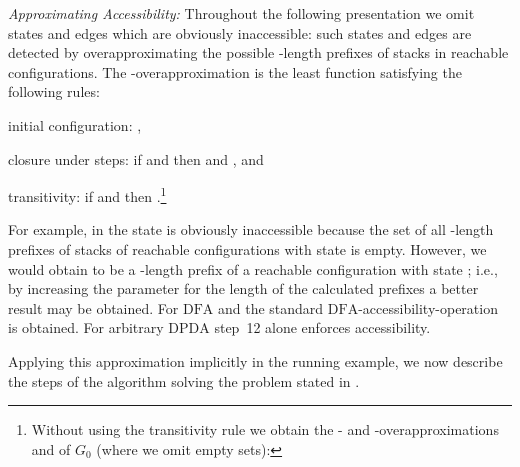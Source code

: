 \documentclass[draft]{ifacconf}
\newcommand{\STEP}[1]{\ensuremath{G_{#1}}\xspace}
\newcommand{\DFA}{\ensuremath{\mathrm{DFA}}\xspace}
\newcommand{\DPDA}{\ensuremath{\mathrm{DPDA}}\xspace}
\newcommand{\myparagraph}[1]{\par\emph{#1:}}
\begin{document}
\myparagraph{Approximating Accessibility}\label{mypar:ApproximatingAccessibility}
Throughout the following presentation we omit states and edges which are obviously inaccessible: such states and edges are detected by overapproximating the possible -length prefixes of stacks in reachable configurations.
The -overapproximation  is the least function satisfying the following rules:
\begin{inparaenum}[(i)]
\item initial configuration: ,
\item closure under steps: if  and  then  and , and
\item transitivity: if  and  then .\footnote{
Without using the transitivity rule we obtain the - and -overapproximations  and  of \STEP{0} (where we omit empty sets):




}
\end{inparaenum}


For example, in  the state  is obviously inaccessible because the set of all -length prefixes of stacks of reachable configurations with state  is empty. However, we would obtain  to be a -length prefix of a reachable configuration with state ; i.e., by increasing the parameter for the length of the calculated prefixes a better result may be obtained. For \DFA and  the standard \DFA-accessibility-operation is obtained.
For arbitrary \DPDA step~12 alone enforces accessibility.

\newcommand{\OPNAME}[1]{\ensuremath{f_{\mathrm{#1}}}\xspace}
\newcommand{\FUNtoSDPDA}{\OPNAME{2SDPDA}}
\newcommand{\FUNfreshSymbol}{\OPNAME{fresh}}
\newcommand{\FUNRNoOp}{\OPNAME{NoNoOp}}
\newcommand{\FUNSPP}{\OPNAME{SPP}}
\newcommand{\FUNRMP}{\OPNAME{RMP}}
\newcommand{\FUNSR}{\OPNAME{SR}}
\newcommand{\epdagamma}{\mathrm{epda\underbar{ }gamma}}
\newcommand{\mathlet}{\mathrm{let}~}
\newcommand{\mathin}{~\mathrm{in}~}

Applying this approximation implicitly in the running example, we now describe the steps of the algorithm solving the problem stated in .
\end{document}
